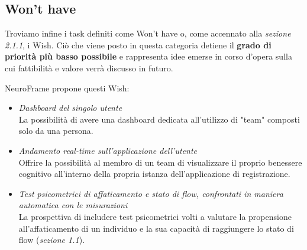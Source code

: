 \subsection{Won't have}
Troviamo infine i task definiti come Won't have o, come accennato alla \emph{sezione 2.1.1}, i Wish.\newline
Ciò che viene posto in questa categoria detiene il {\bf grado di priorità più basso possibile} e rappresenta idee emerse in corso d'opera sulla cui fattibilità e valore verrà discusso in futuro.\newline

\noindent NeuroFrame propone questi Wish:
\begin{itemize}
  \item \emph{Dashboard del singolo utente}\\
  {La possibilità di avere una dashboard dedicata all'utilizzo di "team" composti solo da una persona.}
  \item \emph{Andamento real-time sull'applicazione dell'utente}\\
  {Offrire la possibilità al membro di un team di visualizzare il proprio benessere cognitivo all'interno della propria istanza dell'applicazione di registrazione.}
  \item \emph{Test psicometrici di affaticamento e stato di flow, confrontati in maniera automatica con le misurazioni}\\
  {La prospettiva di includere test psicometrici volti a valutare la propensione all'affaticamento di un individuo e la sua capacità di raggiungere lo stato di flow (\emph{sezione 1.1}).}
\end{itemize}